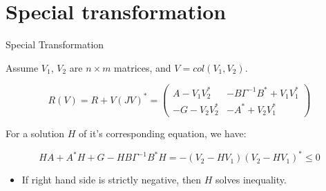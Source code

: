\section{Special transformation}
\begin{frame}{Special Transformation }

Assume $V_{1}$, $V_{2}$ are $n\times m$ matrices, and $V=col(V_{1},V_{2})$.

\begin{equation*}
R(V)=R + V(JV)^{*} = \left(\begin{array}{cc} 
A-V_{1}V_{2}^{*} & -B\Gamma^{-1}B^{*}+V_{1}V_{1}^{*} \\  
-G-V_{2}V_{2}^{*} & -A^{*}+V_{2}V_{1}^{*} \end{array}\right)
\end{equation*}



For a solution $H$ of it's corresponding equation, we have:

\begin{equation*}
HA + A^{*}H + G - HB\Gamma^{-1}B^{*}H = -(V_{2}-HV_{1})(V_{2}-HV_{1})^{*} \le 0
 \end{equation*}

\begin{itemize}
\item If right hand side is strictly negative, then $H$ solves inequality. \end{itemize} 

\end{frame}

%
%
